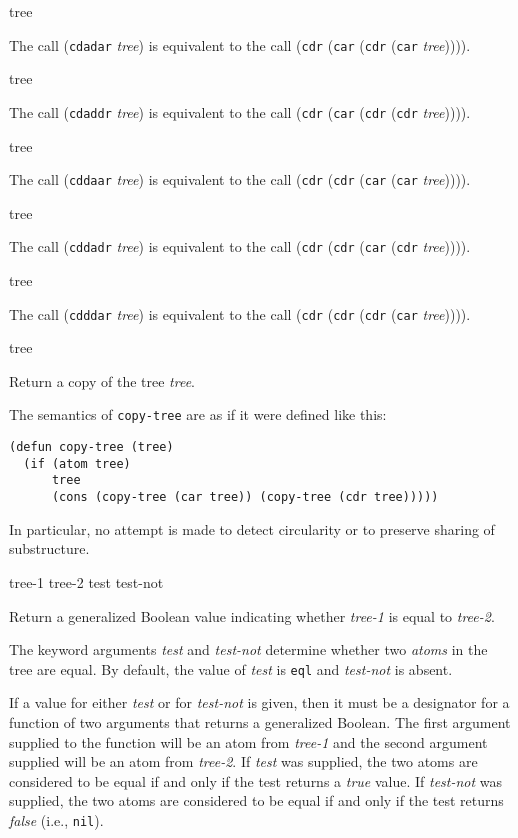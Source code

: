  {tree}

The call (\texttt{cdadar} \textit{tree}) is equivalent to the call
(\texttt{cdr} (\texttt{car} (\texttt{cdr} (\texttt{car}
\textit{tree})))).

 {tree}

The call (\texttt{cdaddr} \textit{tree}) is equivalent to the call
(\texttt{cdr} (\texttt{car} (\texttt{cdr} (\texttt{cdr}
\textit{tree})))).

 {tree}

The call (\texttt{cddaar} \textit{tree}) is equivalent to the call
(\texttt{cdr} (\texttt{cdr} (\texttt{car} (\texttt{car}
\textit{tree})))).

 {tree}

The call (\texttt{cddadr} \textit{tree}) is equivalent to the call
(\texttt{cdr} (\texttt{cdr} (\texttt{car} (\texttt{cdr}
\textit{tree})))).

 {tree}

The call (\texttt{cdddar} \textit{tree}) is equivalent to the call
(\texttt{cdr} (\texttt{cdr} (\texttt{cdr} (\texttt{car}
\textit{tree})))).

 {tree}

Return a copy of the tree \textit{tree}.

The semantics of \texttt{copy-tree} are as if it were defined like
this:

\begin{verbatim}
(defun copy-tree (tree)
  (if (atom tree)
      tree
      (cons (copy-tree (car tree)) (copy-tree (cdr tree)))))
\end{verbatim}

In particular, no attempt is made to detect circularity or to preserve
sharing of substructure.

 {tree-1 tree-2 \key test test-not}

Return a generalized Boolean value indicating whether \textit{tree-1}
is equal to \textit{tree-2}.

The keyword arguments \textit{test} and \textit{test-not} determine
whether two \emph{atoms} in the tree are equal.  By default, the value
of \textit{test} is \texttt{eql} and \textit{test-not} is absent.

If a value for either \textit{test} or for \textit{test-not} is given,
then it must be a designator for a function of two arguments that
returns a generalized Boolean.  The first argument supplied to the
function will be an atom from \textit{tree-1} and the second argument
supplied will be an atom from \textit{tree-2}.  If \textit{test} was
supplied, the two atoms are considered to be equal if and only if the
test returns a \emph{true} value.  If \textit{test-not} was supplied,
the two atoms are considered to be equal if and only if the test
returns \emph{false} (i.e., \texttt{nil}).


